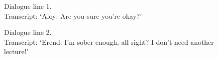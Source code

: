 \begin{figure}[h]
	\centerline{}
	\centerline{}
	\caption{Dialogue line 1. \\ Transcript: `Aloy: Are you sure you're okay?'}\label{fig:screenshotfirst}
\end{figure}

\begin{figure}[h]
	\centerline{}
	\centerline{}
	\caption{Dialogue line 2. \\ Transcript: `Erend: I'm sober enough, all right? I don't need another lecture!'}
\end{figure}

